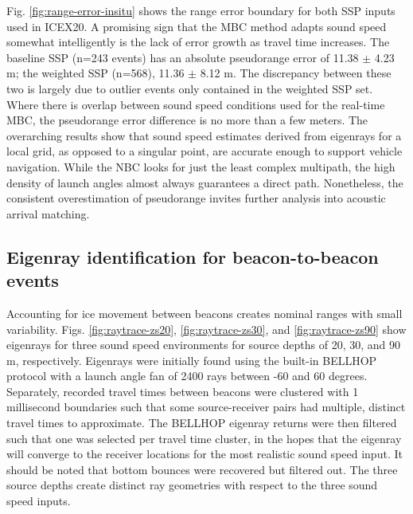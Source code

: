 Fig. \ref{fig:range-error-insitu} shows the range error boundary for both SSP inputs used in ICEX20.
A promising sign that the MBC method adapts sound speed somewhat intelligently is the lack of error growth as travel time increases.
The baseline SSP (n=243 events) has an absolute pseudorange error of 11.38 $\pm$ 4.23 m; the weighted SSP (n=568), 11.36 $\pm$ 8.12 m.
The discrepancy between these two is largely due to outlier events only contained in the weighted SSP set.
Where there is overlap between sound speed conditions used for the real-time MBC, the pseudorange error difference is no more than a few meters.
The overarching results show that sound speed estimates derived from eigenrays for a local grid, as opposed to a singular point, are accurate enough to support vehicle navigation.
While the NBC looks for just the least complex multipath, the high density of launch angles almost always guarantees a direct path.
Nonetheless, the consistent overestimation of pseudorange invites further analysis into acoustic arrival matching.

\subsection{Eigenray identification for beacon-to-beacon events} \label{sec:eigenrays}

Accounting for ice movement between beacons creates nominal ranges with small variability.
Figs. \ref{fig:raytrace-zs20}, \ref{fig:raytrace-zs30}, and \ref{fig:raytrace-zs90} show eigenrays for three sound speed environments for source depths of 20, 30, and 90 m, respectively.
Eigenrays were initially found using the built-in BELLHOP protocol with a launch angle fan of 2400 rays between -60 and 60 degrees.
Separately, recorded travel times between beacons were clustered with 1 millisecond boundaries such that some source-receiver pairs had multiple, distinct travel times to approximate.
The BELLHOP eigenray returns were then filtered such that one was selected per travel time cluster, in the hopes that the eigenray will converge to the receiver locations for the most realistic sound speed input. 
It should be noted that bottom bounces were recovered but filtered out.
The three source depths create distinct ray geometries with respect to the three sound speed inputs.

